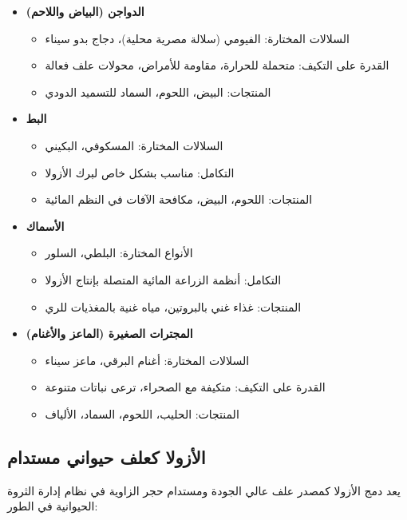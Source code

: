 \begin{itemize}
    \item \textbf{الدواجن (البياض واللاحم)}
    \begin{itemize}
        \item السلالات المختارة: الفيومي (سلالة مصرية محلية)، دجاج بدو سيناء
        \item القدرة على التكيف: متحملة للحرارة، مقاومة للأمراض، محولات علف فعالة
        \item المنتجات: البيض، اللحوم، السماد للتسميد الدودي
    \end{itemize}
    
    \item \textbf{البط}
    \begin{itemize}
        \item السلالات المختارة: المسكوفي، البكيني
        \item التكامل: مناسب بشكل خاص لبرك الأزولا
        \item المنتجات: اللحوم، البيض، مكافحة الآفات في النظم المائية
    \end{itemize}
    
    \item \textbf{الأسماك}
    \begin{itemize}
        \item الأنواع المختارة: البلطي، السلور
        \item التكامل: أنظمة الزراعة المائية المتصلة بإنتاج الأزولا
        \item المنتجات: غذاء غني بالبروتين، مياه غنية بالمغذيات للري
    \end{itemize}
    
    \item \textbf{المجترات الصغيرة (الماعز والأغنام)}
    \begin{itemize}
        \item السلالات المختارة: أغنام البرقي، ماعز سيناء
        \item القدرة على التكيف: متكيفة مع الصحراء، ترعى نباتات متنوعة
        \item المنتجات: الحليب، اللحوم، السماد، الألياف
    \end{itemize}
\end{itemize}

\subsection{الأزولا كعلف حيواني مستدام}

يعد دمج الأزولا كمصدر علف عالي الجودة ومستدام حجر الزاوية في نظام إدارة الثروة الحيوانية في الطور:

